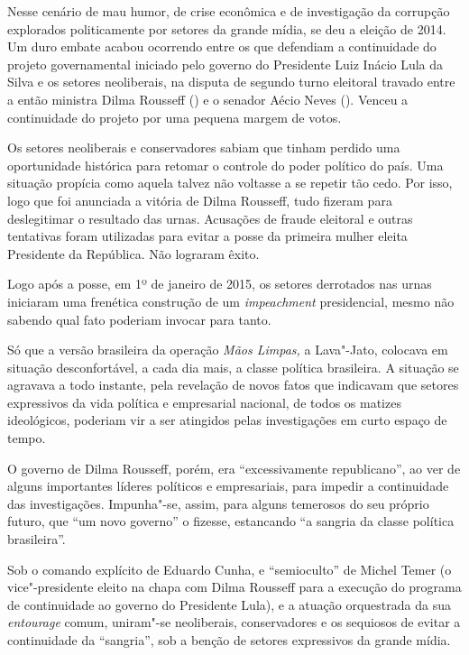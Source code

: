 Nesse cenário de mau humor, de crise econômica e de investigação da
corrupção explorados politicamente por setores da grande mídia, se deu a
eleição de 2014. Um duro embate acabou ocorrendo entre os que defendiam
a continuidade do projeto governamental iniciado pelo governo do
Presidente Luiz Inácio Lula da Silva e os setores neoliberais, na
disputa de segundo turno eleitoral travado entre a então ministra Dilma
Rousseff () e o senador Aécio Neves (). Venceu a continuidade do
projeto por uma pequena margem de votos.

Os setores neoliberais e conservadores sabiam que tinham perdido uma
oportunidade histórica para retomar o controle do poder político do
país. Uma situação propícia como aquela talvez não voltasse a se repetir
tão cedo. Por isso, logo que foi anunciada a vitória de Dilma Rousseff,
tudo fizeram para deslegitimar o resultado das urnas. Acusações de
fraude eleitoral e outras tentativas foram utilizadas para evitar a
posse da primeira mulher eleita Presidente da República. Não lograram
êxito.

Logo após a posse, em 1º de janeiro de 2015, os setores derrotados nas
urnas iniciaram uma frenética construção de um \emph{impeachment}
presidencial, mesmo não sabendo qual fato poderiam invocar para tanto.

Só que a versão brasileira da operação \emph{Mãos Limpas,} a
Lava"-Jato, colocava em situação desconfortável, a cada dia
mais, a classe política brasileira. A situação se agravava a todo
instante, pela revelação de novos fatos que indicavam que setores
expressivos da vida política e empresarial nacional, de todos os matizes
ideológicos, poderiam vir a ser atingidos pelas investigações em curto
espaço de tempo.

O governo de Dilma Rousseff, porém, era ``excessivamente republicano'',
ao ver de alguns importantes líderes políticos e empresariais, para
impedir a continuidade das investigações. Impunha"-se, assim, para alguns
temerosos do seu próprio futuro, que ``um novo governo'' o
fizesse, estancando ``a sangria da classe política brasileira''.

Sob o comando explícito de Eduardo Cunha, e ``semioculto'' de Michel
Temer (o vice"-presidente eleito na chapa com Dilma Rousseff para a
execução do programa de continuidade ao governo do Presidente Lula), e a
atuação orquestrada da sua \emph{entourage} comum, uniram"-se
neoliberais, conservadores e os sequiosos de evitar a continuidade da
``sangria'', sob a benção de setores expressivos da grande mídia.


